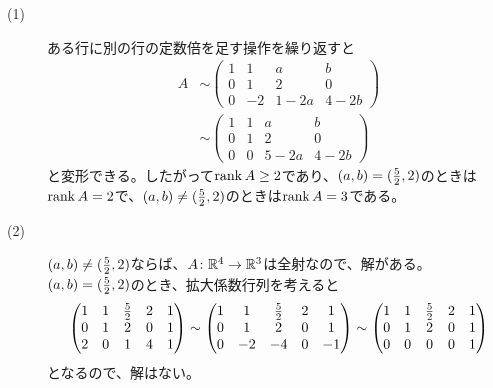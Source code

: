 \begin{sol} ${}$
  \begin{description}
    \item[(1)] ある行に別の行の定数倍を足す操作を繰り返すと
    \begin{align*}
      A &\sim \begin{pmatrix}
      1 & 1 & a & b \\
      0 & 1 & 2 & 0 \\
      0 & -2 & 1-2a & 4-2b
      \end{pmatrix} \\
      &\sim \begin{pmatrix}
      1 & 1 & a & b \\
      0 & 1 & 2 & 0 \\
      0 & 0 & 5-2a & 4-2b
      \end{pmatrix}
    \end{align*}
    と変形できる。したがって$\operatorname{rank} A \geq 2$であり、$(a,b) = (\frac{5}{2}, 2)$のときは$\operatorname{rank} A =2$で、$(a,b) \neq  (\frac{5}{2}, 2)$のときは$\operatorname{rank} A =3$である。
    \item[(2)] $(a,b) \neq  (\frac{5}{2}, 2)$ならば、$A \colon {\mathbb R}^4 \to {\mathbb R}^3$は全射なので、解がある。$(a,b) = (\frac{5}{2}, 2)$のとき、拡大係数行列を考えると
    \begin{align*}
      \begin{pmatrix}
      1 & 1 & \frac{5}{2} & 2 & 1 \\
      0 & 1 & 2 & 0  & 1 \\
      2 & 0 & 1 & 4 & 1
      \end{pmatrix} \sim
      \begin{pmatrix}
      1 & 1 & \frac{5}{2} & 2 & 1 \\
      0 & 1 & 2 & 0  & 1 \\
      0 & -2 & -4 & 0 & -1
      \end{pmatrix}
      \sim \begin{pmatrix}
      1 & 1 & \frac{5}{2} & 2 & 1 \\
      0 & 1 & 2 & 0  & 1 \\
      0 & 0 & 0 & 0 &  1
      \end{pmatrix}
    \end{align*}
    となるので、解はない。
  \end{description}
\end{sol}


\newpage

